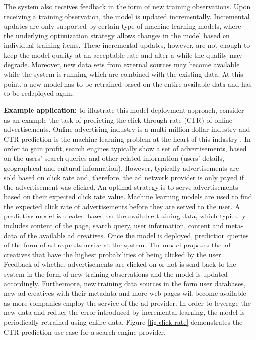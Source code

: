 \documentclass{vldb}
\begin{document}
The system also receives feedback in the form of new training observations.
Upon receiving a training observation, the model is updated incrementally.
Incremental updates are only supported by certain type of machine learning models, where the underlying optimization strategy allows changes in the model based on individual training items.
These incremental updates, however, are not enough to keep the model quality at an acceptable rate and after a while the quality may degrade.
Moreover, new data sets from external sources may become available while the system is running which are combined with the existing data.
At this point, a new model has to be retrained based on the entire available data and has to be redeployed again.

\textbf{Example application:} to illustrate this model deployment approach, consider as an example the task of predicting the click through rate (CTR) of online advertisements.
Online advertising industry is a multi-million dollar industry and CTR prediction is the machine learning problem at the heart of this industry \cite{macmahan2013, graepel2010web}.
In order to gain profit, search engines typically show a set of advertisements, based on the users' search queries and other related information (users' details, geographical and cultural information).
However, typically advertisements are sold based on click rate and, therefore, the ad network provider is only payed if the advertisement was clicked.
An optimal strategy is to serve advertisements based on their expected click rate value.
Machine learning models are used to find the expected click rate of advertisements before they are served to the user.
A predictive model is created based on the available training data, which typically includes content of the page, search query, user information, content and meta-data of the available ad creatives. 
Once the model is deployed, prediction queries of the form of ad requests arrive at the system.
The model proposes the ad creatives that have the highest probabilities of being clicked by the user.
Feedback of whether advertisements are clicked on or not is send back to the system in the form of new training observations and the model is updated accordingly.
Furthermore, new training data sources in the form user databases, new ad creatives with their metadata and more web pages will become available as more companies employ the service of the ad provider.
In order to leverage the new data and reduce the error introduced by incremental learning, the model is periodically retrained using entire data.
Figure \ref{fig:click-rate} demonstrates the CTR prediction use case for a search engine provider.
\end{document}
